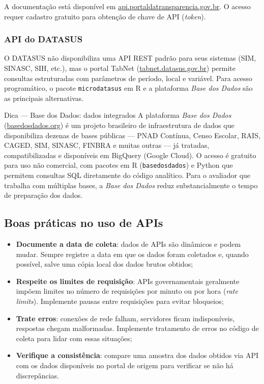 A documentação está disponível em \url{api.portaldatransparencia.gov.br}. O acesso requer cadastro gratuito para obtenção de chave de API (\textit{token}).

\subsubsection{API do DATASUS}

O DATASUS não disponibiliza uma API REST padrão para seus sistemas (SIM, SINASC, SIH, etc.), mas o portal TabNet (\url{tabnet.datasus.gov.br}) permite consultas estruturadas com parâmetros de período, local e variável. Para acesso programático, o pacote \texttt{microdatasus} em R e a plataforma \textit{Base dos Dados} são as principais alternativas.

\begin{boxdica}{Dica --- Base dos Dados: dados integrados}
A plataforma \textit{Base dos Dados} (\url{basedosdados.org}) é um projeto brasileiro de infraestrutura de dados que disponibiliza dezenas de bases públicas --- PNAD Contínua, Censo Escolar, RAIS, CAGED, SIM, SINASC, FINBRA e muitas outras --- já tratadas, compatibilizadas e disponíveis em BigQuery (Google Cloud). O acesso é gratuito para uso não comercial, com pacotes em R (\texttt{basedosdados}) e Python que permitem consultas SQL diretamente do código analítico. Para o avaliador que trabalha com múltiplas bases, a \textit{Base dos Dados} reduz substancialmente o tempo de preparação dos dados.
\end{boxdica}

\subsection{Boas práticas no uso de APIs}

\begin{itemize}
  \item \textbf{Documente a data de coleta}: dados de APIs são dinâmicos e podem mudar. Sempre registre a data em que os dados foram coletados e, quando possível, salve uma cópia local dos dados brutos obtidos;
  \item \textbf{Respeite os limites de requisição}: APIs governamentais geralmente impõem limites no número de requisições por minuto ou por hora (\textit{rate limits}). Implemente pausas entre requisições para evitar bloqueios;
  \item \textbf{Trate erros}: conexões de rede falham, servidores ficam indisponíveis, respostas chegam malformadas. Implemente tratamento de erros no código de coleta para lidar com essas situações;
  \item \textbf{Verifique a consistência}: compare uma amostra dos dados obtidos via API com os dados disponíveis no portal de origem para verificar se não há discrepâncias.
\end{itemize}

